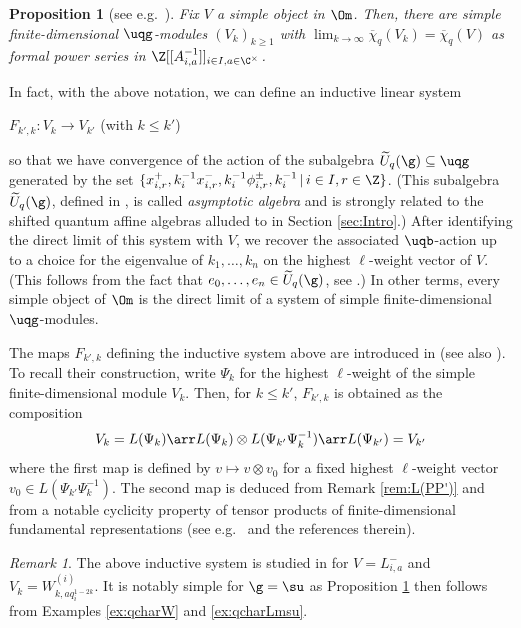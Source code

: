 \documentclass[11pt]{amsart}
\newtheorem{prop}[theorem]{Proposition}
\theoremstyle{definition}
\theoremstyle{remark}
\newtheorem{rem}[theorem]{Remark}
\numberwithin{equation}{section}
\begin{document}
\begin{prop}[see e.g.~{\cite[Theorem 7.6]{hl2}}]\label{prop:limitOm} Fix $V$ a simple object in $\Om$. Then, there are simple finite-dimensional $\uqg$-modules $(V_k)_{k\geq 1}$ with $\textstyle \lim_{k\rightarrow \infty} \overline{\chi}_q(V_k) = \overline{\chi}_q(V)$ as formal power series in $\Z[[A_{i,a}^{-1}]]_{i\in I,a\in \C^{\times}}$.
\end{prop}
In fact, with the above notation, we can define an inductive linear system
\begin{center}
$F_{k',k} : V_k \rightarrow V_{k'}$ \quad (with $k\leq k'$)
\end{center}
so that we have convergence of the action of the subalgebra $\widetilde{U}_q(\g)\subseteq \uqg$ generated by the set $\{x_{i,r}^+,k_i^{-1}x_{i,r}^-,k_i^{-1}\phi_{i,r}^{\pm}, k_i^{-1}\,|\, i\in I, r \in \Z\}$. (This subalgebra $\widetilde{U}_q(\g)$, defined in \cite{hj}, is called \textit{asymptotic algebra} and is strongly related to the shifted quantum affine algebras alluded to in Section \ref{sec:Intro}.)  After identifying the direct limit of this system with $V$, we recover the associated $\uqb$-action up to a choice for the eigenvalue of $k_1,\dots ,k_n$ on the highest $\ell$-weight vector of $V$. (This follows from the fact that $e_0,\dots ,e_n \in \widetilde{U}_q(\g)$, see \cite{hj}.) In other terms, every simple object of $\Om$ is the direct limit of a system of simple finite-dimensional $\uqg$-modules. \par
The maps $F_{k',k}$ defining the inductive system above are introduced in \cite{hj} (see also \cite{hl2}). To recall their construction, write $\Psi_k$ for the highest $\ell$-weight of the simple finite-dimensional module $V_k$. Then, for $k\leq k'$, $F_{k',k}$ is obtained as the composition
$$ V_k = L(\Psi_k) \arr L(\Psi_k)\otimes L(\Psi_{k'}\Psi_k^{-1}) \arr L(\Psi_{k'}) = V_{k'}$$
where the first map is defined by $v \mapsto v\otimes v_0$ for a fixed highest $\ell$-weight vector $v_0 \in L(\Psi_{k'}\Psi_k^{-1})$. The second map is deduced from Remark \ref{rem:L(PP')} and from a notable cyclicity property of tensor products of finite-dimensional fundamental representations
(see e.g.~\cite[Equation 3.21]{hj} and the references  therein).
\begin{rem}\label{rem:LnegW}
The above inductive system is studied in \cite{hj} for %
$ V = L_{i,a}^-$ and $V_k = W_{k,aq_i^{1-2k}}^{(i)} $. It is notably simple for $\g = \su$ as Proposition \ref{prop:limitOm} then follows from Examples \ref{ex:qcharW} and \ref{ex:qcharLmsu}. 
\end{rem}
\end{document}
